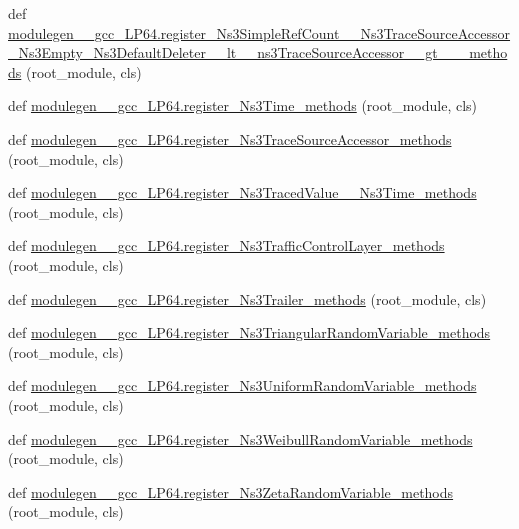 \begin{DoxyCompactItemize}
\item 
def \hyperlink{namespacemodulegen____gcc__LP64_a2971d479713881f4a0fb7f82a5a0c162}{modulegen\+\_\+\+\_\+gcc\+\_\+\+L\+P64.\+register\+\_\+\+Ns3\+Simple\+Ref\+Count\+\_\+\+\_\+\+Ns3\+Trace\+Source\+Accessor\+\_\+\+Ns3\+Empty\+\_\+\+Ns3\+Default\+Deleter\+\_\+\+\_\+lt\+\_\+\+\_\+ns3\+Trace\+Source\+Accessor\+\_\+\+\_\+gt\+\_\+\+\_\+\+\_\+methods} (root\+\_\+module, cls)
\item 
def \hyperlink{namespacemodulegen____gcc__LP64_ade0bc7fc2ce1f975c0f8f367acfc957c}{modulegen\+\_\+\+\_\+gcc\+\_\+\+L\+P64.\+register\+\_\+\+Ns3\+Time\+\_\+methods} (root\+\_\+module, cls)
\item 
def \hyperlink{namespacemodulegen____gcc__LP64_abd8204bf10f1a73956889b2b56b0c2d3}{modulegen\+\_\+\+\_\+gcc\+\_\+\+L\+P64.\+register\+\_\+\+Ns3\+Trace\+Source\+Accessor\+\_\+methods} (root\+\_\+module, cls)
\item 
def \hyperlink{namespacemodulegen____gcc__LP64_a97d4b9ea903c2dd7bcbedd609057165e}{modulegen\+\_\+\+\_\+gcc\+\_\+\+L\+P64.\+register\+\_\+\+Ns3\+Traced\+Value\+\_\+\+\_\+\+Ns3\+Time\+\_\+methods} (root\+\_\+module, cls)
\item 
def \hyperlink{namespacemodulegen____gcc__LP64_a3ff74f5b38de2f73456841b5f80f2346}{modulegen\+\_\+\+\_\+gcc\+\_\+\+L\+P64.\+register\+\_\+\+Ns3\+Traffic\+Control\+Layer\+\_\+methods} (root\+\_\+module, cls)
\item 
def \hyperlink{namespacemodulegen____gcc__LP64_a79f6f84947747209adf07fee76a18188}{modulegen\+\_\+\+\_\+gcc\+\_\+\+L\+P64.\+register\+\_\+\+Ns3\+Trailer\+\_\+methods} (root\+\_\+module, cls)
\item 
def \hyperlink{namespacemodulegen____gcc__LP64_a164735782e09ede8e4cec78054019282}{modulegen\+\_\+\+\_\+gcc\+\_\+\+L\+P64.\+register\+\_\+\+Ns3\+Triangular\+Random\+Variable\+\_\+methods} (root\+\_\+module, cls)
\item 
def \hyperlink{namespacemodulegen____gcc__LP64_a4aa9337458c6bfbb16285c72600d2605}{modulegen\+\_\+\+\_\+gcc\+\_\+\+L\+P64.\+register\+\_\+\+Ns3\+Uniform\+Random\+Variable\+\_\+methods} (root\+\_\+module, cls)
\item 
def \hyperlink{namespacemodulegen____gcc__LP64_a77ea65e0aa1398f09b27adc28eec22cd}{modulegen\+\_\+\+\_\+gcc\+\_\+\+L\+P64.\+register\+\_\+\+Ns3\+Weibull\+Random\+Variable\+\_\+methods} (root\+\_\+module, cls)
\item 
def \hyperlink{namespacemodulegen____gcc__LP64_a0627de79307ebfed0def7640ef614931}{modulegen\+\_\+\+\_\+gcc\+\_\+\+L\+P64.\+register\+\_\+\+Ns3\+Zeta\+Random\+Variable\+\_\+methods} (root\+\_\+module, cls)

\end{DoxyCompactItemize}
